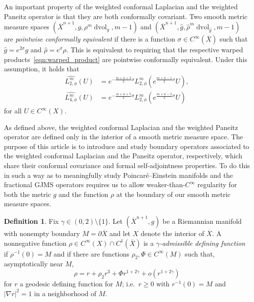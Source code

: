 \documentclass{amsart}
\theoremstyle{definition}
\newtheorem{defn}[thm]{Definition}
\theoremstyle{remark}
\numberwithin{equation}{section}
\begin{document}
An important property of the weighted conformal Laplacian and the weighted Paneitz operator is that they are both conformally covariant.  Two smooth metric measure spaces $({\overline{X}}^{n+1},g,\rho^m\operatorname{dvol}_g,m-1)$ and $({\overline{X}}^{n+1},{\widehat{g}},{\widehat{\rho}}^m\operatorname{dvol}_{\widehat{g}},m-1)$ are \emph{pointwise conformally equivalent} if there is a function $\sigma\in C^\infty({\overline{X}})$ such that ${\widehat{g}}=e^{2\sigma}g$ and ${\widehat{\rho}}=e^\sigma\rho$.  This is equivalent to requiring that the respective warped products~\eqref{eqn:warped_product} are pointwise conformally equivalent.  Under this assumption, it holds that
\begin{align}
\label{eqn:conformally_covariant2} \widehat{L_{2,\phi}^m}(U) & = e^{-\frac{m+n+3}{2}\sigma}L_{2,\phi}^m\left(e^{\frac{m+n-1}{2}\sigma}U\right), \\
\label{eqn:conformally_covariant4} \widehat{L_{4,\phi}^m}(U) & = e^{-\frac{m+n+5}{2}\sigma}L_{2,\phi}^m\left(e^{\frac{m+n-3}{2}\sigma}U\right)
\end{align}
for all $U\in C^\infty(X)$.

As defined above, the weighted conformal Laplacian and the weighted Paneitz operator are defined only in the interior of a smooth metric measure space.  The purpose of this article is to introduce and study boundary operators associated to the weighted conformal Laplacian and the Paneitz operator, respectively, which share their conformal covariance and formal self-adjointness properties.  To do this in such a way as to meaningfully study Poincar\'e--Einstein manifolds and the fractional GJMS operators requires us to allow weaker-than-$C^\infty$ regularity for both the metric $g$ and the function $\rho$ at the boundary of our smooth metric measure spaces.

\begin{defn}
 Fix $\gamma\in(0,2)\setminus\{1\}$.  Let $({\overline{X}}^{n+1},g)$ be a Riemannian manifold with nonempty boundary $M=\partial{\overline{X}}$ and let $X$ denote the interior of ${\overline{X}}$.  A nonnegative function $\rho\in C^\infty(X)\cap C^1({\overline{X}})$ is a \emph{$\gamma$-admissible defining function} if $\rho^{-1}(0)=M$ and if there are functions $\rho_2,\Phi\in C^\infty(M)$ such that, asymptotically near $M$,
 \begin{equation}
  \label{eqn:gamma_admissible}
  \rho = r + \rho_2 r^3 + \Phi r^{1+2\gamma} + o(r^{1+2\gamma})
 \end{equation}
 for $r$ a geodesic defining function for $M$; i.e.\ $r\geq0$ with $r^{-1}(0)=M$ and ${\lvert}\nabla r{\rvert}^2=1$ in a neighborhood of $M$.
\end{defn}
\end{document}
